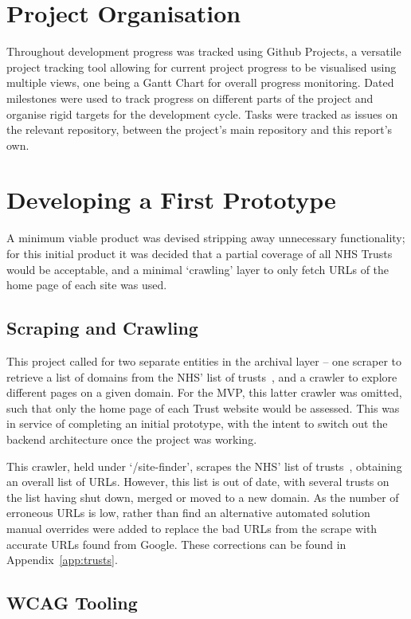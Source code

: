 \pagebreak

\section{Project Organisation}
Throughout development progress was tracked using Github Projects, a versatile project tracking tool allowing for current project progress to be visualised using multiple views, one being a Gantt Chart for overall progress monitoring. Dated milestones were used to track progress on different parts of the project and organise rigid targets for the development cycle. Tasks were tracked as issues on the relevant repository, between the project's main repository and this report's own.

\section{Developing a First Prototype}
A minimum viable product was devised stripping away unnecessary functionality; for this initial product it was decided that a partial coverage of all NHS Trusts would be acceptable, and a minimal `crawling' layer to only fetch URLs of the home page of each site was used.

\subsection{Scraping and Crawling}
This project called for two separate entities in the archival layer --{} one scraper to retrieve a list of domains from the NHS' list of trusts~\cite{NHS_Trust_Directory}, and a crawler to explore different pages on a given domain. For the MVP, this latter crawler was omitted, such that only the home page of each Trust website would be assessed. This was in service of completing an initial prototype, with the intent to switch out the backend architecture once the project was working.

This crawler, held under `/site-finder', %
scrapes the NHS' list of trusts~\cite{NHS_Trust_Directory}, obtaining an overall list of URLs. However, this list is out of date, with several trusts on the list having shut down, merged or moved to a new domain. As the number of erroneous URLs is low, rather than find an alternative automated solution manual overrides were added to replace the bad URLs from the scrape with accurate URLs found from Google. These corrections can be found in Appendix~\ref{app:trusts}.

\subsection{WCAG Tooling}

